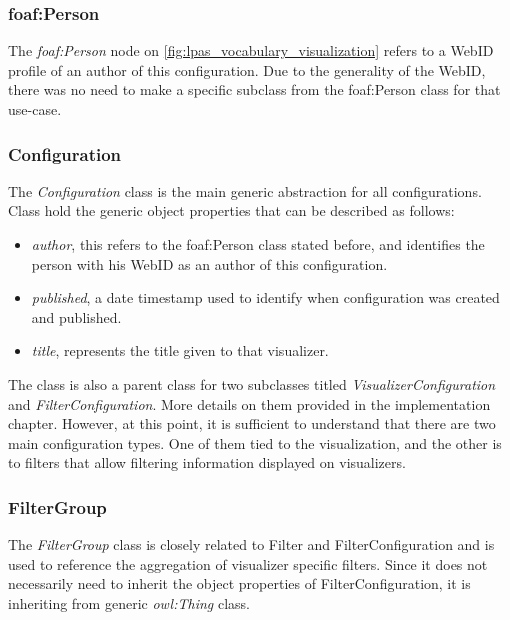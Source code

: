 \subsubsection{foaf:Person}

The \textit{foaf:Person} node on \autoref{fig:lpas_vocabulary_visualization} refers to a WebID profile of an author of this configuration. Due to the generality of the WebID, there was no need to make a specific subclass from the foaf:Person class for that use-case.

\subsubsection{Configuration}
\label{ssssec:configuration}

The \textit{Configuration} class is the main generic abstraction for all \lpa{} configurations. Class hold the generic object properties that can be described as follows:
\begin{itemize}
	\item \textit{author}, this refers to the foaf:Person class stated before, and identifies the person with his WebID as an author of this \lpa{} configuration.
	\item \textit{published}, a date timestamp used to identify when configuration was created and published.
	\item \textit{title}, represents the title given to that \lpa{} visualizer.
\end{itemize}

The class is also a parent class for two subclasses titled \textit{VisualizerConfiguration} and \textit{FilterConfiguration}. More details on them provided in the implementation chapter. However, at this point, it is sufficient to understand that there are two main configuration types. One of them tied to the visualization, and the other is to filters that allow filtering information displayed on visualizers.

\subsubsection{FilterGroup}

The \textit{FilterGroup} class is closely related to Filter and FilterConfiguration and is used to reference the aggregation of visualizer specific filters. Since it does not necessarily need to inherit the object properties of FilterConfiguration, it is inheriting from generic \textit{owl:Thing} class.

